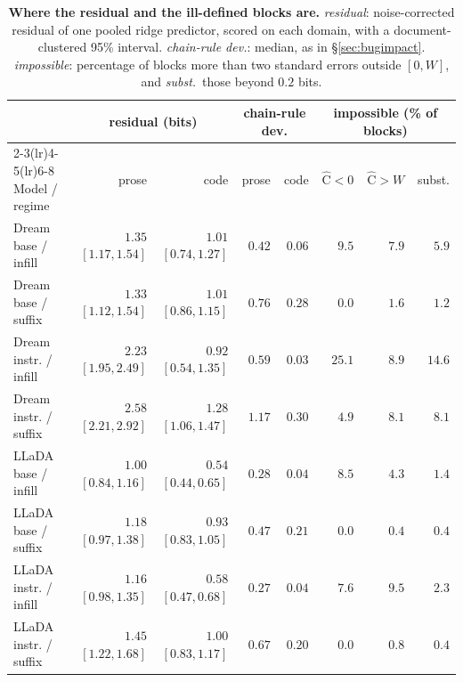 \begin{table}[!ht]
\centering
\footnotesize
\setlength{\tabcolsep}{3.5pt}
\begin{tabular}{lrrrrrrr}
\toprule
 & \multicolumn{2}{c}{residual (bits)} & \multicolumn{2}{c}{chain-rule dev.} & \multicolumn{3}{c}{impossible (\% of blocks)} \\
\cmidrule(lr){2-3}\cmidrule(lr){4-5}\cmidrule(lr){6-8}
Model / regime & prose & code & prose & code & $\widehat{\mathrm{C}}<0$ & $\widehat{\mathrm{C}}>W$ & subst. \\
\midrule
Dream base / infill & $1.35$ \scriptsize$[1.17,1.54]$ & $1.01$ \scriptsize$[0.74,1.27]$ & $0.42$ & $0.06$ & $9.5$ & $7.9$ & $5.9$ \\
Dream base / suffix & $1.33$ \scriptsize$[1.12,1.54]$ & $1.01$ \scriptsize$[0.86,1.15]$ & $0.76$ & $0.28$ & $0.0$ & $1.6$ & $1.2$ \\
Dream instr. / infill & $2.23$ \scriptsize$[1.95,2.49]$ & $0.92$ \scriptsize$[0.54,1.35]$ & $0.59$ & $0.03$ & $25.1$ & $8.9$ & $14.6$ \\
Dream instr. / suffix & $2.58$ \scriptsize$[2.21,2.92]$ & $1.28$ \scriptsize$[1.06,1.47]$ & $1.17$ & $0.30$ & $4.9$ & $8.1$ & $8.1$ \\
LLaDA base / infill & $1.00$ \scriptsize$[0.84,1.16]$ & $0.54$ \scriptsize$[0.44,0.65]$ & $0.28$ & $0.04$ & $8.5$ & $4.3$ & $1.4$ \\
LLaDA base / suffix & $1.18$ \scriptsize$[0.97,1.38]$ & $0.93$ \scriptsize$[0.83,1.05]$ & $0.47$ & $0.21$ & $0.0$ & $0.4$ & $0.4$ \\
LLaDA instr. / infill & $1.16$ \scriptsize$[0.98,1.35]$ & $0.58$ \scriptsize$[0.47,0.68]$ & $0.27$ & $0.04$ & $7.6$ & $9.5$ & $2.3$ \\
LLaDA instr. / suffix & $1.45$ \scriptsize$[1.22,1.68]$ & $1.00$ \scriptsize$[0.83,1.17]$ & $0.67$ & $0.20$ & $0.0$ & $0.8$ & $0.4$ \\
\bottomrule
\end{tabular}
\caption{\textbf{Where the residual and the ill-defined blocks are.} \emph{residual}:
noise-corrected residual of one pooled ridge predictor, scored on each domain, with a
document-clustered 95\% interval. \emph{chain-rule dev.}: median, as in \S\ref{sec:bugimpact}.
\emph{impossible}: percentage of blocks more than two standard errors outside $[0,W]$,
and \emph{subst.}\ those beyond $0.2$ bits.}\label{tab:domain}
\end{table}

